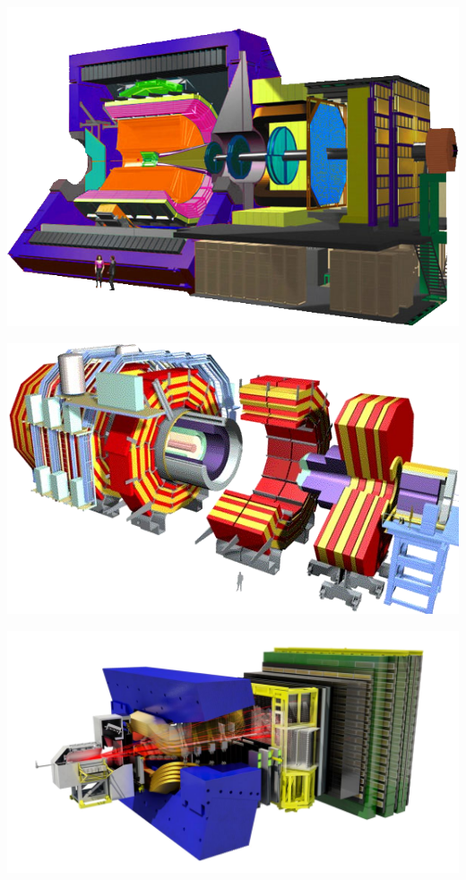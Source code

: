 \marginpar
{
	\includegraphics[width=\marginparwidth]{LHC/alice.png}
	\label{alice}
}

\marginpar
{
	\includegraphics[width=\marginparwidth]{LHC/cms.png}
	\label{cms}
}

\marginpar
{
	
	\includegraphics[width=\marginparwidth]{LHC/lhcb.png}
	\label{lhcb}
}

